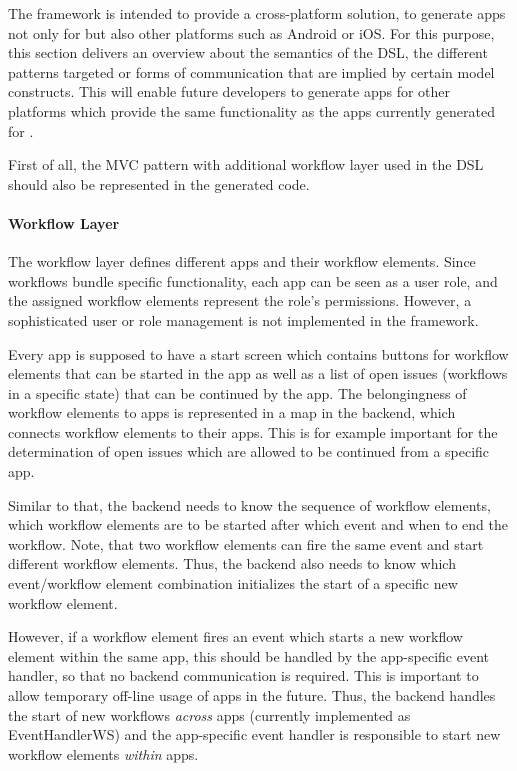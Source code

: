 \label{sec:dev-semantics}

The \MD framework is intended to provide a cross-platform solution, \ie to generate apps not only for \mapapps but also other platforms such as Android or iOS. For this purpose, this section delivers an overview about the semantics of the DSL, \eg the different patterns targeted or forms of communication that are implied by certain model constructs. This will enable future developers to generate apps for other platforms which provide the same functionality as the apps currently generated for \mapapps.

First of all, the MVC pattern with additional workflow layer used in the DSL should also be represented in the generated code.

\paragraph*{Workflow Layer}
The workflow layer defines different apps and their workflow elements. Since workflows bundle specific functionality, each app can be seen as a user role, and the assigned workflow elements represent the role's permissions. However, a sophisticated user or role management is not implemented in the \MD framework.

Every app is supposed to have a start screen which contains buttons for workflow elements that can be started in the app as well as a list of open issues (workflows in a specific state) that can be continued by the app. The belongingness of workflow elements to apps is represented in a map in the backend, which connects workflow elements to their apps. This is for example important for the determination of open issues which are allowed to be continued from a specific app.

Similar to that, the backend needs to know the sequence of workflow elements, \ie which workflow elements are to be started after which event and when to end the workflow. Note, that two workflow elements can fire the same event and start different workflow elements. Thus, the backend also needs to know which event/workflow element combination initializes the start of a specific new workflow element.

However, if a workflow element fires an event which starts a new workflow element within the same app, this should be handled by the app-specific event handler, so that no backend communication is required. This is important to allow temporary off-line usage of apps in the future. Thus, the backend handles the start of new workflows \textit{across} apps (currently implemented as EventHandlerWS) and the app-specific event handler is responsible to start new workflow elements \textit{within} apps.

